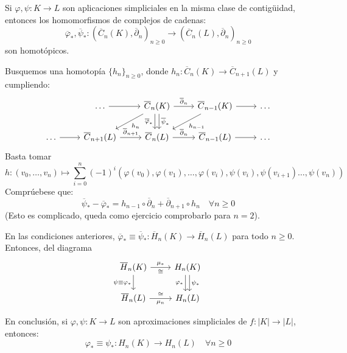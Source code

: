 \documentclass[HS.tex]{subfiles}
\begin{document}
\begin{prop}
Si $\varphi, \psi \colon K \to L$ son aplicaciones simpliciales en la misma clase de contigüidad, entonces los homomorfismos de complejos de cadenas:
\[ \overline{\varphi}_*, \overline{\psi}_* \colon (\overline{C}_n(K), \overline{\partial}_n)_{n \geq 0} \to (\overline{C}_n(L), \overline{\partial}_n)_{n \geq 0}  \]
son homotópicos.
\end{prop}
\begin{dem}
Busquemos una homotopía $\{h_n\}_{n\geq 0}$, donde $h_n \colon \overline{C}_n(K) \to \overline{C}_{n+1}(L)$ y cumpliendo:
\[\begin{tikzcd}
& \dots \arrow[r] & {\overline{C}_n(K)} \arrow[r,"\overline{\partial}_n"] \arrow[dl,"h_n"] \arrow[d,shift right,"\overline{\varphi}_*" left] \arrow[d,shift left,"\overline{\psi}_*" right]& \overline{C}_{n-1}(K) \arrow[r] \arrow[dl,"h_{n-1}"] & \dots\\
\dots \arrow[r] & {\overline{C}_{n+1}(L)} \arrow[r,"\overline{\partial}_{n+1}"] & {\overline{C}_n(L)} \arrow[r,"\overline{\partial}_n"] & {\overline{C}_{n-1}(L)} \arrow[r] & \dots
\end{tikzcd}\]
Basta tomar
\[
	h \colon (v_0,\dots,v_n) \mapsto \sum_{i=0}^n (-1)^i (\varphi(v_0),\varphi(v_1),\dots,\varphi(v_i),\psi(v_i),\psi(v_{i+1})\dots,\psi(v_n))
\]
Comprúebese que:
\[ \overline{\psi}_* - \overline{\varphi}_* = h_{n-1} \circ \overline{\partial}_n + \overline{\partial}_{n+1} \circ h_n \quad \forall n \geq 0 \]
(Esto es complicado, queda como ejercicio comprobarlo para $n=2$).
\end{dem}

\begin{coro}
En las condiciones anteriores, $\overline{\varphi}_* \equiv \overline{\psi}_* \colon \overline{H}_n(K) \to \overline{H}_n(L)$ para todo $n \geq 0$.
Entonces, del diagrama
\[\begin{tikzcd}{\overline{H}_n(K)} \arrow[r,"\mu_*","\cong" below] \arrow[d,"\psi\equiv\varphi_*" left] & {H_n(K)} \arrow[d,shift right,"\varphi_*" left] \arrow[d,shift left,"\psi_*" right]\\
{\overline{H}_n(L)} \arrow[r,"\mu_n" below,"\cong" above] & H_n(L)
\end{tikzcd}\]

En conclusión, si $\varphi, \psi \colon K \to L$ son aproximaciones simpliciales de $f \colon |K| \to |L|$, entonces:
\[ \varphi_{*} \equiv \psi_* \colon H_n(K) \to H_n(L) \quad \forall n \geq 0\]
\end{coro}
\end{document}
